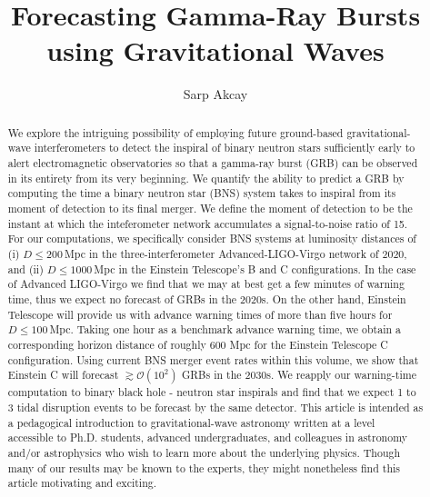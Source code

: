 \documentclass[prd,amsmath,amssymb,aps,floats,amsfonts,notitlepage,superscriptaddress,eqsecnum,nofootinbib,10pt]{revtex4-1}
\newcommand{\ord}{\mathcal{O}}
\begin{document}
\title{Forecasting Gamma-Ray Bursts using Gravitational Waves}

\author{Sarp Akcay}

\begin{abstract}
We explore the intriguing possibility of employing future ground-based gravitational-wave interferometers to detect the inspiral of binary neutron stars sufficiently
early to alert electromagnetic observatories so that a gamma-ray burst (GRB) can be observed in its entirety from its very beginning.
We quantify the ability to predict a GRB by computing the time a binary neutron star (BNS) system takes to inspiral from its moment of detection to its final merger. We define the moment of detection to be the instant at which the inteferometer network accumulates a signal-to-noise ratio of 15. %
For our computations, %
we specifically consider BNS systems at luminosity distances of (i) $D\le200\,$Mpc in the three-interferometer Advanced-LIGO-Virgo network of 2020, and (ii) $D \le 1000\,$Mpc in the Einstein Telescope's B and C configurations. 
In the case of Advanced LIGO-Virgo we find that we may at best get a few minutes of warning time, thus we expect no forecast of GRBs in the 2020s. 
On the other hand, Einstein Telescope will provide us with advance warning times of more than five hours for $D \le 100\,$Mpc.
Taking one hour as a benchmark advance warning time, we obtain a corresponding horizon
distance of roughly 600 Mpc for the Einstein Telescope C configuration.
Using current BNS merger event rates within this volume, we show that Einstein C will forecast $\gtrsim \ord(10^2)$ GRBs in the 2030s. %
We reapply our warning-time computation to binary black hole - neutron star inspirals and find that we expect 1 to 3 tidal disruption events 
to be forecast by the same detector.
This article is intended as a pedagogical introduction to gravitational-wave astronomy written at a level accessible to
Ph.D. students, advanced undergraduates, and colleagues in astronomy and/or astrophysics who wish to learn more about the underlying physics.
Though many of our results may be known to the experts, they might nonetheless find this article motivating and exciting.
\end{abstract}
\maketitle
\end{document}
